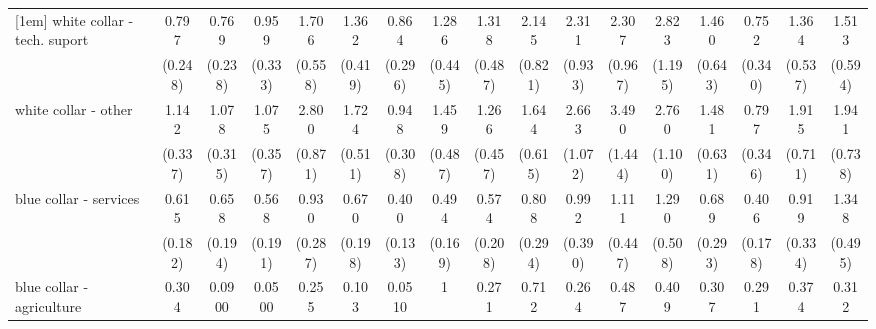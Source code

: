 {\begin{tabular}{l*{16}{c}}
[1em]
white collar - tech. suport&       0.797         &       0.769         &       0.959         &       1.706         &       1.362         &       0.864         &       1.286         &       1.318         &       2.145\sym{*}  &       2.311\sym{*}  &       2.307\sym{*}  &       2.823\sym{*}  &       1.460         &       0.752         &       1.364         &       1.513         \\
                    &     (0.248)         &     (0.238)         &     (0.333)         &     (0.558)         &     (0.419)         &     (0.296)         &     (0.445)         &     (0.487)         &     (0.821)         &     (0.933)         &     (0.967)         &     (1.195)         &     (0.643)         &     (0.340)         &     (0.537)         &     (0.594)         \\
[1em]
white collar - other&       1.142         &       1.078         &       1.075         &       2.800\sym{***}&       1.724         &       0.948         &       1.459         &       1.266         &       1.644         &       2.663\sym{*}  &       3.490\sym{**} &       2.760\sym{*}  &       1.481         &       0.797         &       1.915         &       1.941         \\
                    &     (0.337)         &     (0.315)         &     (0.357)         &     (0.871)         &     (0.511)         &     (0.308)         &     (0.487)         &     (0.457)         &     (0.615)         &     (1.072)         &     (1.444)         &     (1.100)         &     (0.631)         &     (0.346)         &     (0.711)         &     (0.738)         \\
[1em]
blue collar - services&       0.615         &       0.658         &       0.568         &       0.930         &       0.670         &       0.400\sym{**} &       0.494\sym{*}  &       0.574         &       0.808         &       0.992         &       1.111         &       1.290         &       0.689         &       0.406\sym{*}  &       0.919         &       1.348         \\
                    &     (0.182)         &     (0.194)         &     (0.191)         &     (0.287)         &     (0.198)         &     (0.133)         &     (0.169)         &     (0.208)         &     (0.294)         &     (0.390)         &     (0.447)         &     (0.508)         &     (0.293)         &     (0.178)         &     (0.334)         &     (0.495)         \\
[1em]
blue collar - agriculture&       0.304         &      0.0900\sym{**} &      0.0500\sym{**} &       0.255         &       0.103\sym{*}  &      0.0510\sym{**} &           1         &       0.271         &       0.712         &       0.264         &       0.487         &       0.409         &       0.307         &       0.291         &       0.374         &       0.312         \\

\end{tabular}}

